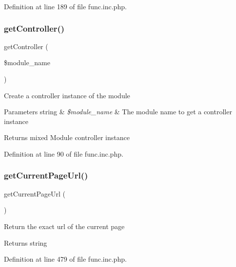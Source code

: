 Definition at line 189 of file func.\+inc.\+php.

\mbox{\label{func_8inc_8php_aa08f01e3bf130d770b373ca8493e3e9b}} 
\subsubsection{\texorpdfstring{get\+Controller()}{getController()}}
{\footnotesize\ttfamily get\+Controller (\begin{DoxyParamCaption}\item[{}]{\$module\+\_\+name }\end{DoxyParamCaption})}

Create a controller instance of the module


\begin{DoxyParams}[1]{Parameters}
string & {\em \$module\+\_\+name} & The module name to get a controller instance \\
\hline
\end{DoxyParams}
\begin{DoxyReturn}{Returns}
mixed Module controller instance 
\end{DoxyReturn}


Definition at line 90 of file func.\+inc.\+php.

\mbox{\label{func_8inc_8php_ae9a94dea2a8e11ebf9010683a124fabf}} 
\subsubsection{\texorpdfstring{get\+Current\+Page\+Url()}{getCurrentPageUrl()}}
{\footnotesize\ttfamily get\+Current\+Page\+Url (\begin{DoxyParamCaption}{ }\end{DoxyParamCaption})}

Return the exact url of the current page

\begin{DoxyReturn}{Returns}
string 
\end{DoxyReturn}


Definition at line 479 of file func.\+inc.\+php.

